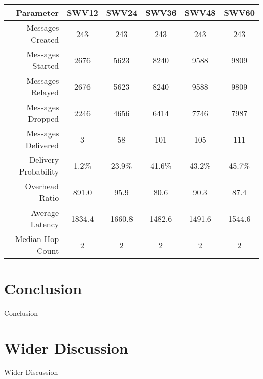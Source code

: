 \documentclass{article}
\begin{document}
\begin{center}
\begin{tabular}{|r|c|c|c|c|c|}
\hline
\textbf{Parameter} & \textbf{SWV12} & \textbf{SWV24} & \textbf{SWV36} & \textbf{SWV48} & \textbf{SWV60} \\ \hline
Messages Created & 243 & 243 & 243 & 243 & 243 \\ \hline
Messages Started & 2676 & 5623 & 8240 & 9588 & 9809 \\ \hline
Messages Relayed & 2676 & 5623 & 8240 & 9588 & 9809 \\ \hline
Messages Dropped & 2246 & 4656 & 6414 & 7746 & 7987 \\ \hline
Messages Delivered & 3 & 58 & 101 & 105 & 111 \\ \hline
Delivery Probability & 1.2\% & 23.9\% & 41.6\% & 43.2\% & 45.7\% \\ \hline
Overhead Ratio & 891.0 & 95.9 & 80.6 & 90.3 & 87.4 \\ \hline
Average Latency & 1834.4 & 1660.8 & 1482.6 & 1491.6 & 1544.6 \\ \hline
Median Hop Count & 2 & 2 & 2 & 2 & 2 \\ \hline
\end{tabular}
\end{center}

\section{Conclusion}
Conclusion

\section{Wider Discussion}
Wider Discussion
\end{document}
